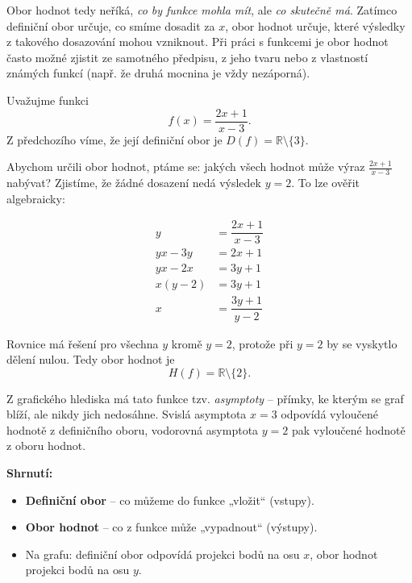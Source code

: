 \documentclass[12pt,a4paper]{article}
\begin{document}
Obor hodnot tedy neříká, \emph{co by funkce mohla mít}, ale \emph{co skutečně má}.  
Zatímco definiční obor určuje, co smíme dosadit za \(x\), obor hodnot určuje, které výsledky z takového dosazování mohou vzniknout.  
Při práci s funkcemi je obor hodnot často možné zjistit ze samotného předpisu, z jeho tvaru nebo z vlastností známých funkcí (např. že druhá mocnina je vždy nezáporná).

\begin{examplebox}
Uvažujme funkci
\[
f(x) = \frac{2x + 1}{x - 3}.
\]
Z předchozího víme, že její definiční obor je \(D(f) = \mathbb{R} \setminus \{3\}\).

Abychom určili obor hodnot, ptáme se: jakých všech hodnot může výraz \(\frac{2x + 1}{x - 3}\) nabývat?  
Zjistíme, že žádné dosazení nedá výsledek \(y = 2\).  
To lze ověřit algebraicky:
\begin{center}
    \[
    \begin{array}{rl}
        y &= \dfrac{2x + 1}{x - 3} \\[6pt]
        yx - 3y &= 2x + 1 \\[6pt]
        yx - 2x &= 3y + 1 \\[6pt]
        x(y - 2) &= 3y + 1 \\[6pt]
        x &= \dfrac{3y + 1}{y - 2}
    \end{array}
    \]
\end{center}



Rovnice má řešení pro všechna \(y\) kromě \(y = 2\), protože při \(y=2\) by se vyskytlo dělení nulou.  
Tedy obor hodnot je 
\[
H(f) = \mathbb{R} \setminus \{2\}.
\]
\end{examplebox}

Z grafického hlediska má tato funkce tzv. \emph{asymptoty} – přímky, ke kterým se graf blíží, ale nikdy jich nedosáhne.  
Svislá asymptota \(x=3\) odpovídá vyloučené hodnotě z definičního oboru,  
vodorovná asymptota \(y=2\) pak vyloučené hodnotě z oboru hodnot.

\begin{notebox}
\textbf{Shrnutí:}  
    \begin{itemize}
      \item \textbf{Definiční obor} – co můžeme do funkce „vložit“ (vstupy).  
      \item \textbf{Obor hodnot} – co z funkce může „vypadnout“ (výstupy).  
      \item Na grafu: definiční obor odpovídá projekci bodů na osu \(x\),  
            obor hodnot projekci bodů na osu \(y\).
    \end{itemize}
\end{notebox}
\end{document}
